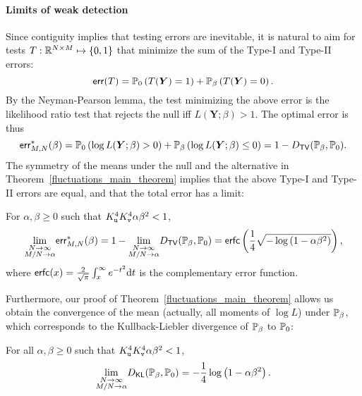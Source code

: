 \documentclass[final,12pt]{colt2018} %
\newcommand{\KL}{\mathsf{KL}}
\newcommand{\TV}{\mathsf{TV}}
\newcommand{\erfc}{\mathsf{erfc}}
\newcommand{\err}{\mathsf{err}}
\newcommand{\utt}{\textup{\texttt{u}}}
\newcommand{\vtt}{\textup{\texttt{v}}}
\newcommand{\Y}{\bm{Y}}
\begin{document}
\paragraph{Limits of weak detection} Since contiguity implies that testing errors are inevitable, it is natural to aim for tests $T:\R^{N\times M} \mapsto \{0,1\}$ that minimize the sum of the Type-I and Type-II errors:
\[\err(T) = \P_{0}\left(T(\Y) = 1\right)+\P_{\beta}\left(T(\Y) = 0\right).\]
By the Neyman-Pearson lemma, the test minimizing the above error is the likelihood ratio test that rejects the null iff $L(\Y;\beta)>1$. The optimal error is thus 
\[\err_{M,N}^*(\beta) = \P_{0}\left(\log L(\Y;\beta) >0\right)+\P_{\beta}\left(\log L(\Y;\beta) \le 0\right) = 1-D_{\TV}(\P_{\beta},\P_{0}).\]
The symmetry of the means under the null and the alternative in Theorem~\ref{fluctuations_main_theorem} implies that the above Type-I and Type-II errors are equal, and that the total error has a limit:  
\begin{corollary}
For $\alpha,\beta \ge 0$ such that  $K_{\utt}^4K_{\vtt}^4\alpha\beta^2 <1$,
\begin{equation*}\label{optimal_error}
\underset{\substack{ N \to \infty \\ M/N \to \alpha}}{\lim} \err_{M,N}^*(\beta)=1-\underset{\substack{ N \to \infty \\ M/N \to \alpha}}{\lim}D_{\TV}(\P_{\beta},\P_{0}) = \erfc\left(\frac{1}{4}\sqrt{- \log \left(1-\alpha \beta^2\right)}\right), 
 \end{equation*}
where $\erfc(x) = \frac{2}{\sqrt{\pi}}\int_x^\infty e^{-t^2}\rmd t$ is the complementary error function. 
\end{corollary}
Furthermore, our proof of Theorem~\ref{fluctuations_main_theorem} allows us obtain the convergence of the mean (actually, all moments of $\log L$) under $\P_{\beta}$, which corresponds to the Kullback-Liebler divergence of $\P_{\beta}$ to $\P_{0}$:
\begin{proposition}\label{kl_convergence}
For all $\alpha,\beta \ge 0$ such that $K_{\utt}^4K_{\vtt}^4\alpha\beta^2<1$,
\[\underset{\substack{ N \to \infty \\ M/N \to \alpha}}{\lim}D_{\KL}(\P_{\beta},\P_{0}) = -\frac{1}{4} \log \left(1-\alpha \beta^2\right).\]   
\end{proposition}
\end{document}
